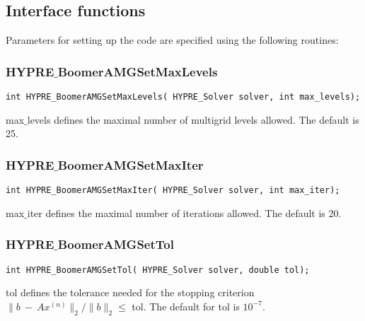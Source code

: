\subsection{Interface functions}

Parameters for setting up the code are specified using the following routines:

\subsubsection*{HYPRE$\_$BoomerAMGSetMaxLevels}
\begin{display}
\begin{verbatim}
int HYPRE_BoomerAMGSetMaxLevels( HYPRE_Solver solver, int max_levels);
\end{verbatim}
\end{display}
max$\_$levels defines the maximal number of multigrid levels allowed.
The default is 25.

\subsubsection*{HYPRE$\_$BoomerAMGSetMaxIter}
\begin{display}
\begin{verbatim}
int HYPRE_BoomerAMGSetMaxIter( HYPRE_Solver solver, int max_iter);
\end{verbatim}
\end{display}
max$\_$iter defines the maximal number of iterations allowed.
The default is 20.

\subsubsection*{HYPRE$\_$BoomerAMGSetTol}
\begin{display}
\begin{verbatim}
int HYPRE_BoomerAMGSetTol( HYPRE_Solver solver, double tol);
\end{verbatim}
\end{display}
tol defines the tolerance needed for the stopping criterion
$\| b ~ - ~ Ax^{(n)} \|_2 / \| b \|_2 \leq $ tol.
The default for tol is $10 ^{-7}$.

